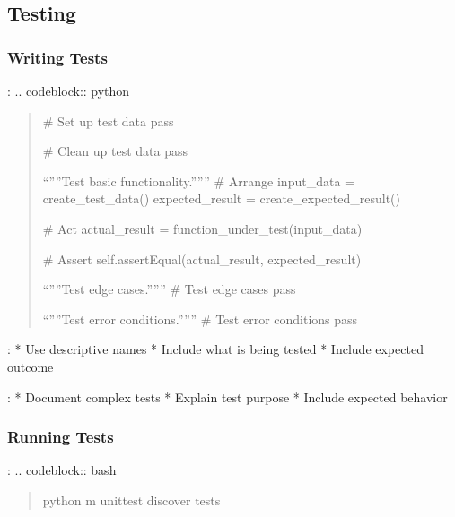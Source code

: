 \documentclass[a4paper,10pt,english,openany,oneside]{sphinxmanual}
\begin{document}
\subsection{Testing}
\label{\detokenize{contributing:testing}}

\subsubsection{Writing Tests}
\label{\detokenize{contributing:writing-tests}}
\sphinxAtStartPar
{}:
.. code\sphinxhyphen{}block:: python
\begin{quote}
\begin{description}
\begin{description}
\sphinxAtStartPar
\# Set up test data
pass

\sphinxAtStartPar
\# Clean up test data
pass

\sphinxAtStartPar
“””Test basic functionality.”””
\# Arrange
input\_data = create\_test\_data()
expected\_result = create\_expected\_result()

\sphinxAtStartPar
\# Act
actual\_result = function\_under\_test(input\_data)

\sphinxAtStartPar
\# Assert
self.assertEqual(actual\_result, expected\_result)

\sphinxAtStartPar
“””Test edge cases.”””
\# Test edge cases
pass

\sphinxAtStartPar
“””Test error conditions.”””
\# Test error conditions
pass

\end{description}

\end{description}
\end{quote}

\sphinxAtStartPar
{}:
* Use descriptive names
* Include what is being tested
* Include expected outcome

\sphinxAtStartPar
{}:
* Document complex tests
* Explain test purpose
* Include expected behavior


\subsubsection{Running Tests}
\label{\detokenize{contributing:running-tests}}
\sphinxAtStartPar
{}:
.. code\sphinxhyphen{}block:: bash
\begin{quote}

\sphinxAtStartPar
python \sphinxhyphen{}m unittest discover tests
\end{quote}
\end{document}
